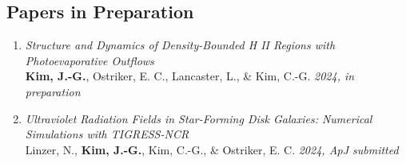 \subsection{Papers in Preparation}
\begin{enumerate}
\item[] \textit{Structure and Dynamics of Density-Bounded H II Regions with Photoevaporative Outflows} \\ \textbf{Kim, J.-G.}, Ostriker, E. C., Lancaster, L., \& Kim, C.-G. \textit{2024, in preparation}
\item[] \textit{Ultraviolet Radiation Fields in Star-Forming Disk Galaxies: Numerical Simulations with TIGRESS-NCR} \\ Linzer, N., \textbf{Kim, J.-G.}, Kim, C.-G., \& Ostriker, E. C. \textit{2024, ApJ submitted}

\end{enumerate}

